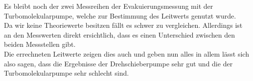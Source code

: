 \noindent
Es bleibt noch der zwei Messreihen der Evakuierungsmessung mit der Turbomolekularpumpe, welche zur Bestimmung des Leitwerts genutzt wurde.\\
Da wir keine Theoriewerte besitzen fällt es schwer zu vergleichen. Allerdings ist an den Messwerten direkt ersichtlich, dass es einen Unterschied zwischen den beiden Messstellen gibt.\\
Die errechneten Leitwerte zeigen dies auch und geben nun 
alles in allem lässt sich also sagen, dass die Ergebnisse der Drehschieberpumpe sehr gut und die der Turbomolekularpumpe sehr schlecht sind.
